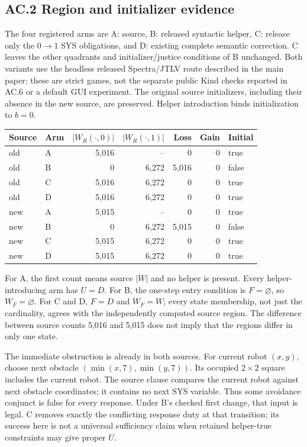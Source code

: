 \subsection*{AC.2 Region and initializer evidence}
The four registered arms are A: source, B: released syntactic helper,
C: release only the $0\to1$ SYS obligations, and D: existing complete
semantic correction. C leaves the other quadrants and initializer/justice
conditions of B unchanged. Both variants use the headless released
Spectra/JTLV route described in the main paper; these are strict games,
not the separate public Kind checks reported in AC.6 or a default GUI experiment.
The original source initializers, including their absence in the new
source, are preserved. Helper introduction binds initialization to $b=0$.

\begin{center}\small
\begin{tabular}{@{}llrrrrl@{}}\toprule
Source & Arm & $|W_R(\cdot,0)|$ & $|W_R(\cdot,1)|$ & Loss & Gain & Initial\\\midrule
old & A & 5,016 & -- & 0 & 0 & true\\
old & B & 0 & 6,272 & 5,016 & 0 & false\\
old & C & 5,016 & 6,272 & 0 & 0 & true\\
old & D & 5,016 & 6,272 & 0 & 0 & true\\
new & A & 5,015 & -- & 0 & 0 & true\\
new & B & 0 & 6,272 & 5,015 & 0 & false\\
new & C & 5,015 & 6,272 & 0 & 0 & true\\
new & D & 5,015 & 6,272 & 0 & 0 & true\\
\bottomrule\end{tabular}
\end{center}
For A, the first count means source $|W|$ and no helper is present.
Every helper-introducing arm has $U=D$.
For B, the one-step entry condition is $F=\varnothing$, so $W_F=\varnothing$.
For C and D, $F=D$ and $W_F=W$; every state membership, not just the
cardinality, agrees with the independently computed source region.
The difference between source counts 5,016 and 5,015 does not imply that
the regions differ in only one state.

The immediate obstruction is already in both sources. For current robot
$(x,y)$, choose next obstacle $(\min(x,7),\min(y,7))$. Its occupied
$2\times2$ square includes the current robot. The source
 clause compares the current robot against next
obstacle coordinates; it contains no next SYS variable. Thus some
avoidance conjunct is false for every response. Under B's checked first
change, that input is legal. C removes exactly the conflicting response
duty at that transition; its success here is not a universal sufficiency
claim when retained helper-true constraints may give proper $U$.

